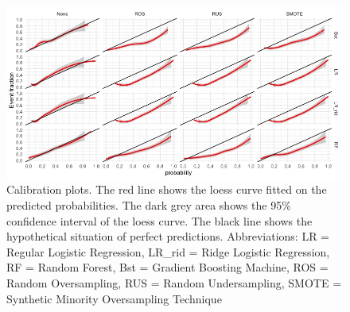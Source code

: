 \documentclass[AMA,STIX1COL, table]{WileyNJD-v2}
\begin{document}
\FloatBarrier
\begin{figure}[hbt!]
    \centering
    \includegraphics[scale = 0.55]{Rplot03.jpeg}
    \caption{Calibration plots. The red line shows the loess curve fitted on the predicted probabilities. The dark grey area shows the 95\% confidence interval of the loess curve. The black line shows the hypothetical situation of perfect predictions. Abbreviations: LR = Regular Logistic Regression, LR\_rid = Ridge Logistic Regression, RF = Random Forest, Bst = Gradient Boosting Machine, ROS = Random Oversampling, RUS = Random Undersampling, SMOTE = Synthetic Minority Oversampling Technique}
    \label{fig1}
\end{figure}

\FloatBarrier
\end{document}
